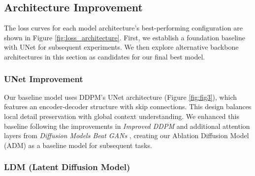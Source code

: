 \documentclass[conference]{IEEEtran}
\begin{document}
\subsection{Architecture Improvement} \label{architecture_improvement}
The loss curves for each model architecture's best-performing configuration are shown in Figure \ref{fig:loss_architecture}. First, we establish a foundation baseline with UNet for subsequent experiments. We then explore alternative backbone architectures in this section as candidates for our final best model.

\subsubsection{UNet Improvement} \label{unet_improvements}

Our baseline model uses DDPM's UNet architecture (Figure \ref{fig:fig3})\cite{ronnebergerUNetConvolutionalNetworks2015}, which features an encoder-decoder structure with skip connections. This design balances local detail preservation with global context understanding. We enhanced this baseline following the improvements in \textit{Improved DDPM} and additional attention layers from \textit{Diffusion Models Beat GANs} \cite{dhariwalDiffusionModelsBeat2021}, creating our Ablation Diffusion Model (ADM) as a baseline model for subsequent tasks.

\subsubsection{LDM (Latent Diffusion Model)}\label{ldm}
\end{document}
